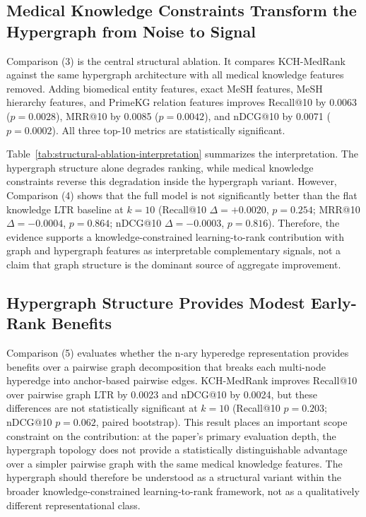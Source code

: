 \subsection{Medical Knowledge Constraints Transform the Hypergraph from Noise to Signal}

Comparison (3) is the central structural ablation. It compares KCH-MedRank against the same hypergraph architecture with all medical knowledge features removed. Adding biomedical entity features, exact MeSH features, MeSH hierarchy features, and PrimeKG relation features improves Recall@10 by 0.0063 ($p = 0.0028$), MRR@10 by 0.0085 ($p = 0.0042$), and nDCG@10 by 0.0071 ($p = 0.0002$). All three top-10 metrics are statistically significant.



Table~\ref{tab:structural-ablation-interpretation} summarizes the interpretation. The hypergraph structure alone degrades ranking, while medical knowledge constraints reverse this degradation inside the hypergraph variant. However, Comparison (4) shows that the full model is not significantly better than the flat knowledge LTR baseline at $k{=}10$ (Recall@10 $\Delta=+0.0020$, $p=0.254$; MRR@10 $\Delta=-0.0004$, $p=0.864$; nDCG@10 $\Delta=-0.0003$, $p=0.816$). Therefore, the evidence supports a knowledge-constrained learning-to-rank contribution with graph and hypergraph features as interpretable complementary signals, not a claim that graph structure is the dominant source of aggregate improvement.

\subsection{Hypergraph Structure Provides Modest Early-Rank Benefits}

Comparison (5) evaluates whether the n-ary hyperedge representation provides benefits over a pairwise graph decomposition that breaks each multi-node hyperedge into anchor-based pairwise edges. KCH-MedRank improves Recall@10 over pairwise graph LTR by 0.0023 and nDCG@10 by 0.0024, but these differences are not statistically significant at $k{=}10$ (Recall@10 $p{=}0.203$; nDCG@10 $p{=}0.062$, paired bootstrap). This result places an important scope constraint on the contribution: at the paper's primary evaluation depth, the hypergraph topology does not provide a statistically distinguishable advantage over a simpler pairwise graph with the same medical knowledge features. The hypergraph should therefore be understood as a structural variant within the broader knowledge-constrained learning-to-rank framework, not as a qualitatively different representational class.

